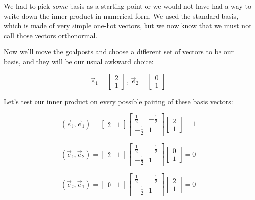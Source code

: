 We had to pick \textit{some} basis as a starting point or we would not have had a way to write down the inner product in numerical form. We used the standard basis, which is made of very simple one-hot vectors, but we now know that we must not call those vectors orthonormal.

Now we'll move the goalposts and choose a different set of vectors to be our basis, and they will be our usual awkward choice:

$$
\vec{e}_1 = \begin{bmatrix}2 \\ 1\end{bmatrix}\,,\,
\vec{e}_2 = \begin{bmatrix}0 \\ 1\end{bmatrix}
$$

Let's test our inner product on every possible pairing of these basis vectors:

$$
(\vec{e}_1, \vec{e}_1) =
\begin{bmatrix}
2 & 1
\end{bmatrix}
\begin{bmatrix}
\frac{1}{2} & -\frac{1}{2} \\
-\frac{1}{2} & 1
\end{bmatrix}
\begin{bmatrix}
2 \\ 1
\end{bmatrix}
= 1
$$    

$$
(\vec{e}_1, \vec{e}_2) =
\begin{bmatrix}
2 & 1
\end{bmatrix}
\begin{bmatrix}
\frac{1}{2} & -\frac{1}{2} \\
-\frac{1}{2} & 1
\end{bmatrix}
\begin{bmatrix}
0 \\ 1
\end{bmatrix}
= 0
$$    

$$
(\vec{e}_2, \vec{e}_1) =
\begin{bmatrix}
0 & 1
\end{bmatrix}
\begin{bmatrix}
\frac{1}{2} & -\frac{1}{2} \\
-\frac{1}{2} & 1
\end{bmatrix}
\begin{bmatrix}
2 \\ 1
\end{bmatrix}
= 0
$$    

